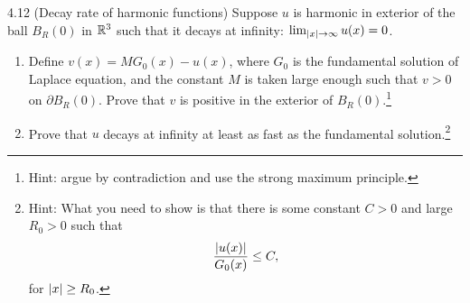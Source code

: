 \begin{question}{4.12 (Decay rate of harmonic functions) }{}
    Suppose $u$ is harmonic in exterior of the ball $B_R(0)$ in $\mathbb{R}^3$ such that it decays at infinity: $\lim_{\abs{x}\to\infty}u(x)=0$.
    \begin{enumerate}[label=(\roman*)]
        \item Define $v(x)=MG_0(x)-u(x)$, where $G_0$ is the fundamental solution of Laplace equation, and the constant $M$ is taken large enough such that $v>0$ on $\partial B_R(0)$. Prove that $v$ is positive in the exterior of $B_R(0)$.\footnote{Hint: argue by contradiction and use the strong maximum principle.}
        \item Prove that $u$ decays at infinity at least as fast as the fundamental solution.\footnote{Hint: What you need to show is that there is some constant $C>0$ and large $R_0>0$ such that \[\frac{\abs{u(x)}}{G_0(x)}\leq C,\] for $\abs{x}\geq R_0$.}
    \end{enumerate}
\end{question}
